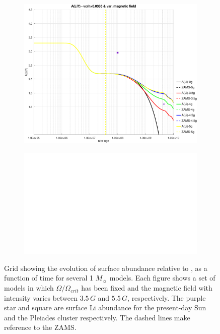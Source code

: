 \documentclass[fleqn,usenatbib]{mnras}
\begin{document}
\begin{figure}
\begin{subfigure}[h]{0.47\textwidth}
    \includegraphics[trim = 35mm 15mm 15mm 15mm, clip,width=\textwidth]{figures/li_vc_0336_var_g.eps}
    \label{fig:subim25}
    \end{subfigure}
    \begin{subfigure}[h]{0.47\textwidth}
    \includegraphics[width=\textwidth]{figures/blank.eps}
    \label{fig:subim26}
    \end{subfigure}
\caption{Grid showing the evolution of surface  abundance relative to , as a function of time for several 1 $M_{\sun}$ models. Each figure shows a set of models in which $\Omega / \Omega_{crit}$ has been fixed and the magnetic field with intensity varies between $3.5\,G$ and $5.5\,G$, respectively. The purple star and square are surface Li abundance for the present-day Sun \citep{Asplund2009} and the Pleiades cluster \citep{Sestito2005} respectively. The dashed lines make reference to the ZAMS.}
\label{fig:grid_li_var_g}
\end{figure}
\end{document}
